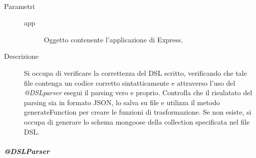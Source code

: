 \begin{description}
\begin{mldescription}
  \hfill \\  	
 	\begin{description}
    		\item[Parametri] \hfill
    			\begin{description}
    				\item[app]
    				Oggetto contenente l'applicazione di Express.
    			\end{description}
    		\item[Descrizione]
    		Si occupa di verificare la correttezza del DSL scritto, verificando che tale file contenga un codice corretto sintatticamente e attraverso l'uso del \textit{@DSLparser} esegui il parsing vero e proprio. Controlla che il risulatato del parsing sia in formato JSON, lo salva su file e utilizza il metodo generateFunction per creare le funzioni di trasformazione. Se non esiste, si occupa di generare lo schema mongoose della collection specificata nel file DSL.
    \end{description}
 \end{mldescription}
 
\end{description}
\subparagraph{@DSLParser}
